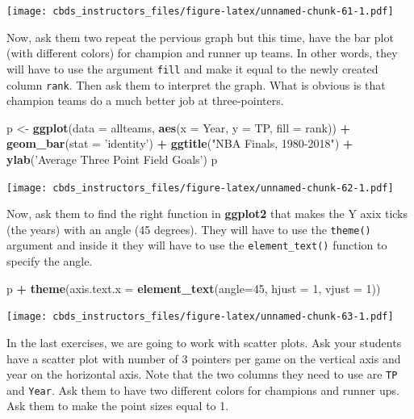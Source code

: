 \documentclass[]{book}
\newenvironment{Shaded}{\begin{snugshade}}{\end{snugshade}}
\newcommand{\DataTypeTok}[1]{\textcolor[rgb]{0.13,0.29,0.53}{#1}}
\newcommand{\DecValTok}[1]{\textcolor[rgb]{0.00,0.00,0.81}{#1}}
\newcommand{\KeywordTok}[1]{\textcolor[rgb]{0.13,0.29,0.53}{\textbf{#1}}}
\newcommand{\NormalTok}[1]{#1}
\newcommand{\OperatorTok}[1]{\textcolor[rgb]{0.81,0.36,0.00}{\textbf{#1}}}
\newcommand{\StringTok}[1]{\textcolor[rgb]{0.31,0.60,0.02}{#1}}
\begin{document}
\texttt{[image: cbds\_instructors\_files/figure-latex/unnamed-chunk-61-1.pdf]}

Now, ask them two repeat the pervious graph but this time, have the bar plot (with different colors) for champion and runner up teams. In other words, they will have to use the argument \texttt{fill} and make it equal to the newly created column \texttt{rank}. Then ask them to interpret the graph. What is obvious is that champion teams do a much better job at three-pointers.

\begin{Shaded}
\begin{Highlighting}[]
\NormalTok{p <-}\StringTok{ }\KeywordTok{ggplot}\NormalTok{(}\DataTypeTok{data =}\NormalTok{ allteams, }\KeywordTok{aes}\NormalTok{(}\DataTypeTok{x =}\NormalTok{ Year, }\DataTypeTok{y =}\NormalTok{ TP, }\DataTypeTok{fill =}\NormalTok{ rank)) }\OperatorTok{+}\StringTok{ }
\StringTok{    }\KeywordTok{geom_bar}\NormalTok{(}\DataTypeTok{stat =} \StringTok{'identity'}\NormalTok{) }\OperatorTok{+}
\StringTok{    }\KeywordTok{ggtitle}\NormalTok{(}\StringTok{"NBA Finals, 1980-2018"}\NormalTok{) }\OperatorTok{+}
\StringTok{    }\KeywordTok{ylab}\NormalTok{(}\StringTok{'Average Three Point Field Goals'}\NormalTok{)}
\NormalTok{p}
\end{Highlighting}
\end{Shaded}

\texttt{[image: cbds\_instructors\_files/figure-latex/unnamed-chunk-62-1.pdf]}

Now, ask them to find the right function in \textbf{ggplot2} that makes the Y axix ticks (the years) with an angle (45 degrees). They will have to use the \texttt{theme()} argument and inside it they will have to use the \texttt{element\_text()} function to specify the angle.

\begin{Shaded}
\begin{Highlighting}[]
\NormalTok{p }\OperatorTok{+}\StringTok{ }\KeywordTok{theme}\NormalTok{(}\DataTypeTok{axis.text.x =} \KeywordTok{element_text}\NormalTok{(}\DataTypeTok{angle=}\DecValTok{45}\NormalTok{, }\DataTypeTok{hjust =} \DecValTok{1}\NormalTok{, }\DataTypeTok{vjust =} \DecValTok{1}\NormalTok{))}
\end{Highlighting}
\end{Shaded}

\texttt{[image: cbds\_instructors\_files/figure-latex/unnamed-chunk-63-1.pdf]}

In the last exercises, we are going to work with scatter plots. Ask your students have a scatter plot with number of 3 pointers per game on the vertical axis and year on the horizontal axis. Note that the two columns they need to use are \texttt{TP} and \texttt{Year}. Ask them to have two different colors for champions and runner ups. Ask them to make the point sizes equal to 1.
\end{document}
